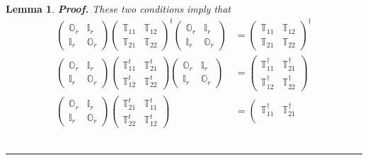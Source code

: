 \documentclass[aps, preprint]{revtex4}
\newtheorem{lemma}[theorem]{Lemma}
\newenvironment{proof}[1][Proof]{\noindent\textbf{#1.} }{\ \rule{0.5em}{0.5em}}
\begin{document}
\begin{lemma}
\begin{proof}
These two conditions imply that
\begin{align}\left (\begin{array}{cc}\mathbb{O}_{r} & \mathbb{I}_{r} \\
\mathbb{I}_{r} & \mathbb{O}_{r}\end{array}\right ) \left (\begin{array}{cc}\mathbb{T}_{1 1} & \mathbb{T}_{1 2} \\
\mathbb{T}_{2 1} & \mathbb{T}_{2 2}\end{array}\right )^{t} \left (\begin{array}{cc}\mathbb{O}_{r} & \mathbb{I}_{r} \\
\mathbb{I}_{r} & \mathbb{O}_{r}\end{array}\right ) &  =\left (\begin{array}{cc}\mathbb{T}_{1 1} & \mathbb{T}_{1 2} \\
\mathbb{T}_{2 1} & \mathbb{T}_{2 2}\end{array}\right )^{ \dag } \\
\left (\begin{array}{cc}\mathbb{O}_{r} & \mathbb{I}_{r} \\
\mathbb{I}_{r} & \mathbb{O}_{r}\end{array}\right ) \left (\begin{array}{cc}\mathbb{T}_{1 1}^{t} & \mathbb{T}_{2 1}^{t} \\
\mathbb{T}_{1 2}^{t} & \mathbb{T}_{2 2}^{t}\end{array}\right ) \left (\begin{array}{cc}\mathbb{O}_{r} & \mathbb{I}_{r} \\
\mathbb{I}_{r} & \mathbb{O}_{r}\end{array}\right ) &  =\left (\begin{array}{cc}\mathbb{T}_{1 1}^{ \dag } & \mathbb{T}_{2 1}^{ \dag } \\
\mathbb{T}_{1 2}^{ \dag } & \mathbb{T}_{2 2}^{ \dag }\end{array}\right ) \\
\left (\begin{array}{cc}\mathbb{O}_{r} & \mathbb{I}_{r} \\
\mathbb{I}_{r} & \mathbb{O}_{r}\end{array}\right ) \left (\begin{array}{cc}\mathbb{T}_{2 1}^{t} & \mathbb{T}_{1 1}^{t} \\
\mathbb{T}_{2 2}^{t} & \mathbb{T}_{1 2}^{t}\end{array}\right ) &  =\left (\begin{array}{cc}\mathbb{T}_{1 1}^{ \dag } & \mathbb{T}_{2 1}^{ \dag } \\

\end{array}
\end{align}
\end{proof}
\end{lemma}
\end{document}
